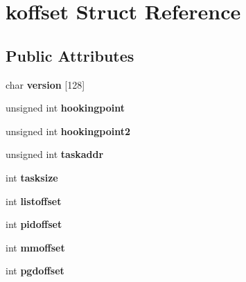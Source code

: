 \hypertarget{structkoffset}{\section{koffset \-Struct \-Reference}
\label{structkoffset}
}
\subsection*{\-Public \-Attributes}
\begin{DoxyCompactItemize}
\item 
\hypertarget{structkoffset_a329ae041a1cf35c34b0d59e8a5165d9e}{char {\bfseries version} \mbox{[}128\mbox{]}}\label{structkoffset_a329ae041a1cf35c34b0d59e8a5165d9e}

\item 
\hypertarget{structkoffset_a0acd219de9ee2546c1e8db9618b9c303}{unsigned int {\bfseries hookingpoint}}\label{structkoffset_a0acd219de9ee2546c1e8db9618b9c303}

\item 
\hypertarget{structkoffset_ae4d3b04cce4c3b77f4334426209c3eb9}{unsigned int {\bfseries hookingpoint2}}\label{structkoffset_ae4d3b04cce4c3b77f4334426209c3eb9}

\item 
\hypertarget{structkoffset_a01b896b39606e85d57540437ef779ba7}{unsigned int {\bfseries taskaddr}}\label{structkoffset_a01b896b39606e85d57540437ef779ba7}

\item 
\hypertarget{structkoffset_a7ec6ffedd426b9a495e3c25b7451a44e}{int {\bfseries tasksize}}\label{structkoffset_a7ec6ffedd426b9a495e3c25b7451a44e}

\item 
\hypertarget{structkoffset_a49565bcc32239a3401a34f302adb03ae}{int {\bfseries listoffset}}\label{structkoffset_a49565bcc32239a3401a34f302adb03ae}

\item 
\hypertarget{structkoffset_acb7d98076b0bb0a2597e985271fed3d8}{int {\bfseries pidoffset}}\label{structkoffset_acb7d98076b0bb0a2597e985271fed3d8}

\item 
\hypertarget{structkoffset_aadef801f42edc86d44e39be49bdfb56b}{int {\bfseries mmoffset}}\label{structkoffset_aadef801f42edc86d44e39be49bdfb56b}

\item 
\hypertarget{structkoffset_a948c79bee6801a6c0fd84852d495947c}{int {\bfseries pgdoffset}}\label{structkoffset_a948c79bee6801a6c0fd84852d495947c}


\end{DoxyCompactItemize}
